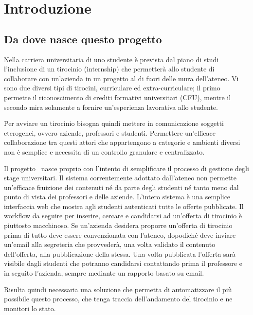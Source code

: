 \nocite{*}

\chapter{Introduzione}

\section{Da dove nasce questo progetto}

Nella carriera universitaria di uno studente è prevista dal piano di studi l'inclusione di un tirocinio (internship) che permetterà allo studente di collaborare con un'azienda in un progetto al di fuori delle mura dell'ateneo. Vi sono due diversi tipi di tirocini, curriculare ed extra-curriculare; il primo permette il riconoscimento di crediti formativi universitari (CFU), mentre il secondo mira solamente a fornire un'esperienza lavorativa allo studente.

Per avviare un tirocinio bisogna quindi mettere in comunicazione soggetti eterogenei, ovvero aziende, professori e studenti. Permettere un'efficace collaborazione tra questi attori che appartengono a categorie e ambienti diversi non è semplice e necessita di un controllo granulare e centralizzato.

Il progetto \projectName~nasce proprio con l'intento di semplificare il processo di gestione degli stage universitari. Il sistema correntemente adottato dall'ateneo non permette un'efficace fruizione dei contenuti né da parte degli studenti né tanto meno dal punto di vista dei professori e delle aziende. L'intero sistema è una semplice interfaccia web che mostra agli studenti autenticati tutte le offerte pubblicate.
%
Il workflow da seguire per inserire, cercare e candidarsi ad un'offerta di tirocinio è piuttosto macchinoso. Se un'azienda desidera proporre un'offerta di tirocinio prima di tutto deve essere convenzionata con l'ateneo, dopodiché deve inviare un'email alla segreteria che provvederà, una volta validato il contenuto dell'offerta, alla pubblicazione della stessa. Una volta pubblicata l'offerta sarà visibile dagli studenti che potranno candidarsi contattando prima il professore e in seguito l'azienda, sempre mediante un rapporto basato su email. 

Risulta quindi necessaria una soluzione che permetta di automatizzare il più possibile questo processo, che tenga traccia dell'andamento del tirocinio e ne monitori lo stato.



